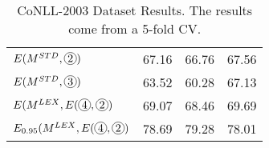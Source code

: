 \begin{table}[]
\begin{tabular}{@{\makebox[1.25em][l]{\rownumber\space}}llll@{}}
%
$E(M^{STD}, \circlednumber{2})$      & 67.16          & 66.76           & 67.56	          \\
$E(M^{STD}, \circlednumber{3})$      & 63.52          & 60.28           & 67.13	          \\ 
\midrule
%
$E(M^{LEX}, E(\circlednumber{4}, \circlednumber{2})$       & 69.07          & 68.46           & 69.69         \\
$E_{0.95}(M^{LEX}, E(\circlednumber{4}, \circlednumber{2})$       & 78.69          & 79.28           & 78.01         \\

\bottomrule
\end{tabular}
\caption{CoNLL-2003 Dataset Results. The results come from a 5-fold CV.}
\label{tab:wikigold}
\end{table}
